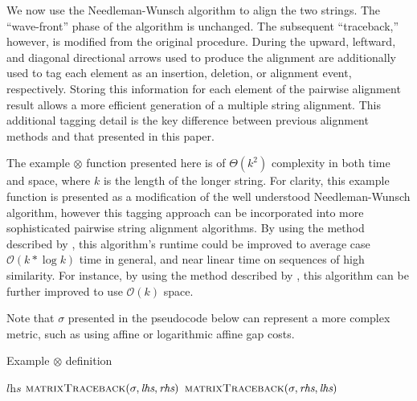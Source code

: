 \documentclass[11pt]{article}
\begin{document}
We now use the Needleman-Wunsch algorithm to align the two strings. The ``wave-front'' phase of the algorithm is unchanged. The subsequent ``traceback,'' however, is modified from the original procedure.
During the upward, leftward, and diagonal directional arrows used to produce the alignment are additionally used to tag each element as an insertion, deletion, or alignment event, respectively. 
Storing this information for each element of the pairwise alignment result allows a more efficient generation of a multiple string alignment.
This additional tagging detail is the key difference between previous alignment methods and that presented in this paper.

The example $\otimes$ function presented here is of $\Theta\left( k^2 \right)$ complexity in both time and space, where $k$ is the length of the longer string.
For clarity, this example function is presented as a modification of the well understood Needleman-Wunsch algorithm, however this tagging approach can be incorporated into more sophisticated pairwise string alignment algorithms.
By using the method described by \cite{Ukkonen1985}, this algorithm's runtime could be improved to average case $\mathcal{O}\left( k * \log k \right)$ time in general, and near linear time on sequences of high similarity.
For instance, by using the method described by \cite{Hirschberg1975}, this algorithm can be further improved to use $\mathcal{O}\left( k \right)$ space.

Note that $\sigma$ presented in the pseudocode below can represent a more complex metric, such as using affine or logarithmic affine gap costs.

\begin{algorithm}
  \caption{Example $\otimes$ definition}\label{pairwiseAlignment}
  \begin{algorithmic}[1]
    \Ensure{$\Sigma_{\Gamma}^{*}$}
      \newline
        \State \Return $\textit{lhs}$
        \State \Return $\Call{matrixTraceback}{\sigma, \textit{lhs}, \textit{rhs}}$
      \Else
        \State \Return $\Call{matrixTraceback}{\sigma, \textit{rhs}, \textit{lhs}}$
      \EndIf
    \EndFunction
  \end{algorithmic}
\end{algorithm}
\end{document}
